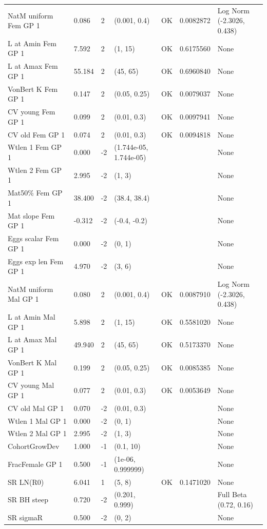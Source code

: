 \documentclass[
  english,
  a4paper,
]{article}
\begin{document}
\begin{landscape}
\begin{longtable}[t]{>{\raggedright\arraybackslash}p{8.5cm}lllll>{\raggedright\arraybackslash}p{4cm}}
\endfoot
\bottomrule
\endlastfoot
NatM uniform Fem GP 1 & 0.086 & 2 & (0.001, 0.4) & OK & 0.0082872 & Log Norm (-2.3026, 0.438)\\
L at Amin Fem GP 1 & 7.592 & 2 & (1, 15) & OK & 0.6175560 & None\\
L at Amax Fem GP 1 & 55.184 & 2 & (45, 65) & OK & 0.6960840 & None\\
VonBert K Fem GP 1 & 0.147 & 2 & (0.05, 0.25) & OK & 0.0079037 & None\\
CV young Fem GP 1 & 0.099 & 2 & (0.01, 0.3) & OK & 0.0097941 & None\\
CV old Fem GP 1 & 0.074 & 2 & (0.01, 0.3) & OK & 0.0094818 & None\\
Wtlen 1 Fem GP 1 & 0.000 & -2 & (1.744e-05, 1.744e-05) &  &  & None\\
Wtlen 2 Fem GP 1 & 2.995 & -2 & (1, 3) &  &  & None\\
Mat50\% Fem GP 1 & 38.400 & -2 & (38.4, 38.4) &  &  & None\\
Mat slope Fem GP 1 & -0.312 & -2 & (-0.4, -0.2) &  &  & None\\
Eggs scalar Fem GP 1 & 0.000 & -2 & (0, 1) &  &  & None\\
Eggs exp len Fem GP 1 & 4.970 & -2 & (3, 6) &  &  & None\\
NatM uniform Mal GP 1 & 0.080 & 2 & (0.001, 0.4) & OK & 0.0087910 & Log Norm (-2.3026, 0.438)\\
L at Amin Mal GP 1 & 5.898 & 2 & (1, 15) & OK & 0.5581020 & None\\
L at Amax Mal GP 1 & 49.940 & 2 & (45, 65) & OK & 0.5173370 & None\\
VonBert K Mal GP 1 & 0.199 & 2 & (0.05, 0.25) & OK & 0.0085385 & None\\
CV young Mal GP 1 & 0.077 & 2 & (0.01, 0.3) & OK & 0.0053649 & None\\
CV old Mal GP 1 & 0.070 & -2 & (0.01, 0.3) &  &  & None\\
Wtlen 1 Mal GP 1 & 0.000 & -2 & (0, 1) &  &  & None\\
Wtlen 2 Mal GP 1 & 2.995 & -2 & (1, 3) &  &  & None\\
CohortGrowDev & 1.000 & -1 & (0.1, 10) &  &  & None\\
FracFemale GP 1 & 0.500 & -1 & (1e-06, 0.999999) &  &  & None\\
SR LN(R0) & 6.041 & 1 & (5, 8) & OK & 0.1471020 & None\\
SR BH steep & 0.720 & -2 & (0.201, 0.999) &  &  & Full Beta (0.72, 0.16)\\
SR sigmaR & 0.500 & -2 & (0, 2) &  &  & None\\

\end{longtable}
\end{landscape}
\end{document}
